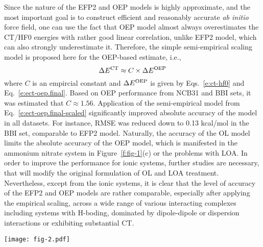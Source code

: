 \documentclass[aip,jcp,amsmath,amssymb,reprint,floatfix]{revtex4-1}
\begin{document}
Since the nature of the EFP2 and OEP models is highly approximate,
and the most important goal is to construct efficient and reasonably
accurate \emph{ab initio} force field, one can use the fact that
OEP model almost always overestimates the CT/HF0 energies
with rather good linear correlation,
unlike EFP2 model, which can also strongly underestimate it.
Therefore, the simple semi\hyp{}empirical scaling model is proposed here
for the OEP\hyp{}based estimate, i.e.,
%
\begin{equation} \label{e:ect-oep.final-scaled}
 \Delta E^{\rm CT} \approx C \times \Delta E^{\rm OEP}
\end{equation}
%
where $C$ is an empircial constant and $\Delta E^{\rm OEP}$ is given by
Eqs.~\eqref{e:ct-hf0} and Eq.~\eqref{e:ect-oep.final}. Based on
OEP performance from NCB31 and BBI sets, it was estimated
that $C\approx 1.56$. Application of the semi\hyp{}empirical model
from Eq.~\eqref{e:ect-oep.final-scaled} significantly improved
absolute accuracy of the model in all datasets. 
For instance, RMSE was reduced down to 0.13 kcal/mol in the BBI set,
comparable to EFP2 model.
Naturally, the accuracy of the OL model limits the absolute accuracy
of the OEP model, which is manifested in the ammonium nitrate system
in Figure~\ref{f:fig-1}(c) or the problems with LOA. 
In order to improve the performance for ionic systems,
further studies are necessary, that will modify the original formulation
of OL and LOA treatment. Nevertheless, except from the ionic systems,
it is clear that the level of accuracy of the EFP2 and OEP models are rather comparable,
especially after applying the empirical scaling,
across a wide range of various interacting complexes including 
systems with H-boding, dominated by dipole-dipole or dispersion interactions or 
exhibiting substantial CT.





%
\begin{figure*}[h]
\texttt{[image: fig-2.pdf]}
\caption{\label{f:fig-2} {\bf Accuracy of the ERI elimination technique.}
(a) NCB31 
database,\cite{Zhao.Schultz.Truhlar.JCTC.2006,
Zhao.Truhlar.JCTC.2005,Zhao.Schultz.Truhlar.JCTC.2006,Zhao.Schultz.Truhlar.JCP.2005} 
and
(b) BBI subset\cite{Burns.Faver.Zheng.Marshall.Smith.Vanommeslaeghe.MacKerell.Merz.Sherrill.JCP.2017} 
from the BioFragment Database.
For the OEP calculations, the EDF-1 scheme with the aug-cc-pVDZ-jkfit auxiliary basis set
was used.
} 
\end{figure*}
%
\end{document}
